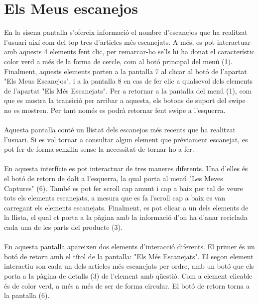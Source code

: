 \documentclass{article}
\begin{document}
\section{Els Meus escanejos}
En la sisena pantalla s'ofereix informació el nombre
d'escanejos que ha realitzat l'usuari
així com del top tres d'articles més escanejats.
A més, es pot interactuar amb aquests 4 elements fent clic,
per remarcar-ho se'ls hi ha donat el característic color verd
a més de la forma de cercle, com al botó principal del menú (1).
Finalment, aquests elements porten a la pantalla 7 al clicar al botó
de l'apartat "Els Meus Escanejos", i a la pantalla 8 en
cas de fer clic a qualsevol dels elements de l'apartat
"Els Més Escanejats".
Per a retornar a la pantalla del menú (1), com que es mostra
la transició per arribar a aquesta, els botons de suport
del swipe no es mostren. Per tant només es podrà
retornar fent swipe a l'esquerra.
\\\\
%
Aquesta pantalla conté un llistat dels escanejos més recents
que ha realitzat l'usuari. Si es vol tornar a consultar
algun element que prèviament escanejat, es pot fer de forma senzilla
sense la necessitat de tornar-ho a fer.
\\\\
En aquesta interfície es pot
interactuar de tres maneres diferents. Una d'elles és
el botó de retorn de dalt a l'esquerra,
la qual porta al menú "Les Meves Captures" (6). També es pot fer scroll
cap amunt i cap a baix per tal de veure tots els elements escanejats, a mesura que
es fa l'scroll cap a baix es van carregant els elements escanejats.
Finalment, es pot clicar a un dels elements de la llista, el qual
et porta a la pàgina amb la informació d'on ha d'anar reciclada cada una
de les parts del producte (3).
\\\\
%
En aquesta pantalla apareixen dos elements d'interacció
diferents. El primer és un botó de retorn amb
el títol de la pantalla: "Els Més Escanejats".
El segon element interactiu son cada un
dels articles més escanejats per ordre,
amb un botó que els porta a la pàgina de detalls (3) de
l'element amb qüestió. Com a element clicable és de color
verd, a més a més de ser de forma circular. El botó de
retorn torna a la pantalla (6).
\end{document}
